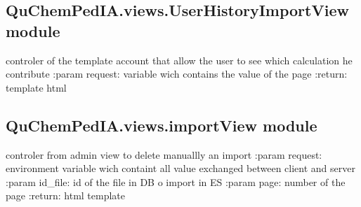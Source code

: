 \documentclass[letterpaper,10pt,english]{sphinxmanual}
\begin{document}
\subsection{QuChemPedIA.views.UserHistoryImportView module}
\label{\detokenize{QuChemPedIA.views:module-QuChemPedIA.views.UserHistoryImportView}}\label{\detokenize{QuChemPedIA.views:quchempedia-views-userhistoryimportview-module}}

\begin{fulllineitems}
\label{\detokenize{QuChemPedIA.views:QuChemPedIA.views.UserHistoryImportView.user_history_import}}
controler of the template account that allow the user to see which calculation he contribute
:param request: variable wich contains the value of the page
:return: template html

\end{fulllineitems}



\subsection{QuChemPedIA.views.importView module}
\label{\detokenize{QuChemPedIA.views:module-QuChemPedIA.views.importView}}\label{\detokenize{QuChemPedIA.views:quchempedia-views-importview-module}}

\begin{fulllineitems}
\label{\detokenize{QuChemPedIA.views:QuChemPedIA.views.importView.delete_import}}
controler from admin view to delete manuallly an import
:param request: environment variable wich containt all value exchanged between client and server
:param id\_file: id of the file in DB o import in ES
:param page: number of the page
:return: html template

\end{fulllineitems}

\end{document}
